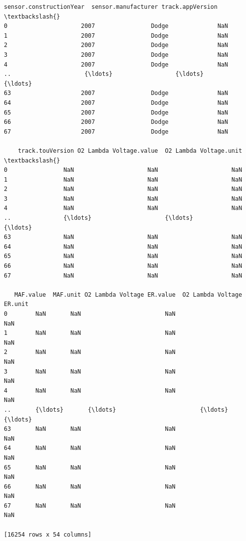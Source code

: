 \documentclass[11pt]{article}
\begin{document}
\begin{tcolorbox}[breakable, size=fbox, boxrule=.5pt, pad at break*=1mm, opacityfill=0]
\begin{Verbatim}[commandchars=\\\{\}]
   sensor.constructionYear  sensor.manufacturer track.appVersion  \textbackslash{}
0                     2007                Dodge              NaN
1                     2007                Dodge              NaN
2                     2007                Dodge              NaN
3                     2007                Dodge              NaN
4                     2007                Dodge              NaN
..                     {\ldots}                  {\ldots}              {\ldots}
63                    2007                Dodge              NaN
64                    2007                Dodge              NaN
65                    2007                Dodge              NaN
66                    2007                Dodge              NaN
67                    2007                Dodge              NaN

    track.touVersion O2 Lambda Voltage.value  O2 Lambda Voltage.unit  \textbackslash{}
0                NaN                     NaN                     NaN
1                NaN                     NaN                     NaN
2                NaN                     NaN                     NaN
3                NaN                     NaN                     NaN
4                NaN                     NaN                     NaN
..               {\ldots}                     {\ldots}                     {\ldots}
63               NaN                     NaN                     NaN
64               NaN                     NaN                     NaN
65               NaN                     NaN                     NaN
66               NaN                     NaN                     NaN
67               NaN                     NaN                     NaN

   MAF.value  MAF.unit O2 Lambda Voltage ER.value  O2 Lambda Voltage ER.unit
0        NaN       NaN                        NaN                        NaN
1        NaN       NaN                        NaN                        NaN
2        NaN       NaN                        NaN                        NaN
3        NaN       NaN                        NaN                        NaN
4        NaN       NaN                        NaN                        NaN
..       {\ldots}       {\ldots}                        {\ldots}                        {\ldots}
63       NaN       NaN                        NaN                        NaN
64       NaN       NaN                        NaN                        NaN
65       NaN       NaN                        NaN                        NaN
66       NaN       NaN                        NaN                        NaN
67       NaN       NaN                        NaN                        NaN

[16254 rows x 54 columns]
\end{Verbatim}
\end{tcolorbox}
        
\end{document}
